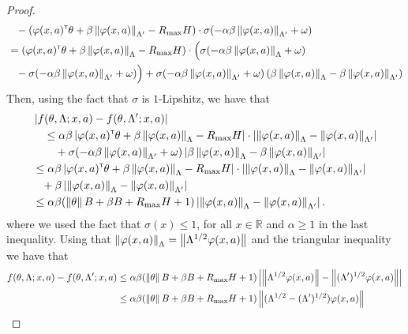 \begin{proof}
\begin{align*}
        &\phantom{=}- \left( \varphi(x,a)^\mathsf{\scriptscriptstyle T} \theta + \beta \left\|\varphi(x,a)\right\|_{\Lambda'} 
        - R_{\max} H \right)\cdot \sigma(- \alpha\beta \left\|\varphi(x,a)\right\|_{\Lambda'} + \omega) \\
        &= \left( \varphi(x,a)^\mathsf{\scriptscriptstyle T} \theta + \beta \left\|\varphi(x,a)\right\|_{\Lambda} 
        - R_{\max} H \right)\cdot \Bigl(\sigma(- \alpha\beta \left\|\varphi(x,a)\right\|_{\Lambda} + \omega) \\
        &\phantom{=}- \sigma(- \alpha\beta \left\|\varphi(x,a)\right\|_{\Lambda'} + \omega) \Bigr) + \sigma(- \alpha\beta \left\|\varphi(x,a)\right\|_{\Lambda'} + \omega) \left({\beta \left\|\varphi(x,a)\right\|_{\Lambda} - \beta \left\|\varphi(x,a)\right\|_{\Lambda'}}\right)
    \end{align*}
    Then, using the fact that $\sigma$ is $1$-Lipshitz, we have that
    \begin{align*}
        &\left|f(\theta,\Lambda;x,a) - f(\theta,\Lambda';x,a)\right| \\
        &\quad \leq \alpha \beta \left|\varphi(x,a)^\mathsf{\scriptscriptstyle T} \theta + \beta \left\|\varphi(x,a)\right\|_{\Lambda} - R_{\max} H\right| \cdot \left|\left\|\varphi(x,a)\right\|_{\Lambda} - \left\|\varphi(x,a)\right\|_{\Lambda'}\right| \\
        &\quad\quad + \sigma(- \alpha\beta \left\|\varphi(x,a)\right\|_{\Lambda'} + \omega) \left|\beta \left\|\varphi(x,a)\right\|_{\Lambda} - \beta \left\|\varphi(x,a)\right\|_{\Lambda'}\right| \\
        &\leq \alpha\beta \left|\varphi(x,a)^\mathsf{\scriptscriptstyle T} \theta + \beta \left\|\varphi(x,a)\right\|_{\Lambda} 
        - R_{\max} H\right| \cdot \left|\left\|\varphi(x,a)\right\|_{\Lambda} 
        - \left\|\varphi(x,a)\right\|_{\Lambda'}\right|
        \\&\phantom{=}+  \beta \left|\left\|\varphi(x,a)\right\|_{\Lambda} - \left\|\varphi(x,a)\right\|_{\Lambda'}\right| \\
        &\leq \alpha\beta (\left\|\theta\right\|B + \beta B + R_{\max} H + 1) 
        \left|\left\|\varphi(x,a)\right\|_{\Lambda} - \left\|\varphi(x,a)\right\|_{\Lambda'}\right|.
    \end{align*}
    where we used the fact that $\sigma(x) \leq 1$, for all $x\in \mathbb{R}$ and $\alpha \geq 1$ in the last inequality. 
    Using that $\left\|\varphi (x,a)\right\|_{\Lambda} = \left\|\Lambda^{1/2} \varphi(x,a)\right\|$ and the triangular inequality we have that
    \begin{align*}
        f(\theta,\Lambda;x,a) - f(\theta,\Lambda';x,a) &\leq 
        \alpha\beta (\norm{\theta}B + \beta B +\RMAX H + 1) 
        \abs{\norm{\Lambda^{1/2}\phi(x,a)} - \norm{(\Lambda')^{1/2}\phi(x,a)}} \\
        &\leq \alpha\beta (\norm{\theta}B + \beta B +\RMAX H + 1) \norm{(\Lambda^{1/2} - (\Lambda')^{1/2})\phi(x,a)} \\

\end{align*}
\end{proof}
